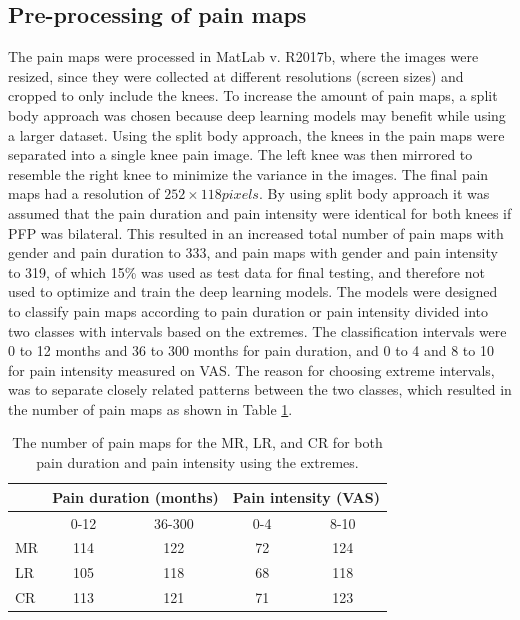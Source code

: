 \subsection{Pre-processing of pain maps}
The pain maps were processed in MatLab v. R2017b, where the images were resized, since they were collected at different resolutions (screen sizes) and cropped to only include the knees. To increase the amount of pain maps, a split body approach was chosen because deep learning models may benefit while using a larger dataset. Using the split body approach, the knees in the pain maps were separated into a single knee pain image. The left knee was then mirrored to resemble the right knee to minimize the variance in the images. The final pain maps had a resolution of $252 \times 118 pixels$.
By using split body approach it was assumed that the pain duration and pain intensity were identical for both knees if PFP was bilateral. This resulted in an increased total number of pain maps with gender and pain duration to 333, and pain maps with gender and pain intensity to 319, of which 15\% was used as test data for final testing, and therefore not used to optimize and train the deep learning models. \newline
\noindent
The models were designed to classify pain maps according to pain duration or pain intensity divided into two classes with intervals based on the extremes. The classification intervals were 0 to 12 months and 36 to 300 months for pain duration, and 0 to 4 and 8 to 10 for pain intensity measured on VAS. The reason for choosing extreme intervals, was to separate closely related patterns between the two classes, which resulted in the number of pain maps as shown in Table \ref{tab:painmaps}.

\begin{table}[H]
\centering
\begin{tabular}{@{}lcccc@{}}
\toprule
   & \multicolumn{2}{c}{Pain duration (months)} & \multicolumn{2}{c}{Pain intensity (VAS)} \\ \midrule
   & 0-12                & 36-300               & 0-4                & 8-10                \\ \midrule
MR & 114                 & 122                  & 72                 & 124                 \\
LR & 105                 & 118                  & 68                 & 118                 \\
CR & 113                 & 121                  & 71                 & 123                 \\ \bottomrule
\end{tabular}
\caption{The number of pain maps for the MR, LR, and CR for both pain duration and pain intensity using the extremes.}
\label{tab:painmaps}
\end{table}

